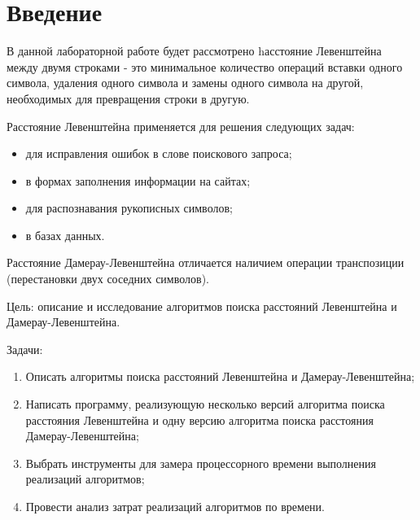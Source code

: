 \chapter*{Введение}

В данной лабораторной работе будет рассмотрено hасстояние Левенштейна между двумя строками - это минимальное количество операций вставки одного символа, удаления одного символа и замены одного символа на другой, необходимых для превращения строки в другую\cite{levenshtein}. 

Расстояние Левенштейна применяется для решения следующих задач:
\begin{itemize}
	\item для исправления ошибок в слове поискового запроса;
	\item в формах заполнения информации на сайтах;
	\item для распознавания рукописных символов;
	\item в базах данных.
\end{itemize}

Расстояние Дамерау-Левенштейна отличается наличием операции транспозиции (перестановки двух соседних символов).

Цель: описание и исследование алгоритмов поиска расстояний Левенштейна и Дамерау-Левенштейна.

Задачи:
\begin{enumerate}[label={\arabic*)}]
	\item Описать алгоритмы поиска расстояний Левенштейна и Дамерау-Левенштейна;
	\item Написать программу, реализующую несколько версий алгоритма поиска расстояния Левенштейна и одну версию алгоритма поиска расстояния Дамерау-Левенштейна;
	\item Выбрать инструменты для замера процессорного времени выполнения реализаций алгоритмов;
	\item Провести анализ затрат реализаций алгоритмов по времени.
\end{enumerate}